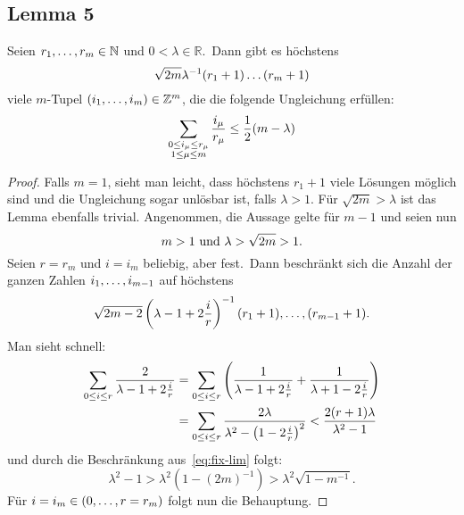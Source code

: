\subsection{Lemma 5}
    \label{subsec:lemma5}
    \textrm{Seien $r_1, \dots, r_m \in \mathbb{N}$ und $0 < \lambda \in \mathbb{R}$.\ Dann gibt es höchstens}
    \begin{equation*}
        \sqrt{2m} \lambda^{-1} (r_1 + 1) \dots (r_m +1)
    \end{equation*}
    \textrm{viele $m$-Tupel $(i_1, \dots, i_m) \in \mathbb{Z}^m$, die die folgende Ungleichung erfüllen:}
    \begin{equation*}
        \sum_{\substack{0 \leq i_\mu \leq r_\mu \\ 1 \leq \mu \leq m}} \frac{i_\mu}{r_\mu} \leq \frac{1}{2} (m - \lambda)
    \end{equation*}
    \begin{proof}
        \textrm{Falls $m = 1$, sieht man leicht, dass höchstens $r_1 + 1$ viele Lösungen möglich sind und die Ungleichung
        sogar unlösbar ist, falls $\lambda > 1$.
        \newline
        Für $\sqrt{2m} > \lambda$ ist das Lemma ebenfalls trivial.}
        \newline
        \textrm{Angenommen, die Aussage gelte für $m-1$ und seien nun}
        \begin{equation}
            m > 1 \ \textrm{und}\  \lambda > \sqrt{2m} > 1. \label{eq:sqrt-2m-ass}
        \end{equation}
        \textrm{Seien $r = r_m$ und $i = i_m$ beliebig, aber fest.\ Dann beschränkt sich die Anzahl der ganzen Zahlen
        $i_1, \dots, i_{m-1}$ auf höchstens}
        \begin{equation}
            \sqrt{2m - 2} \left( \lambda - 1 + 2 \frac{i}{r} \right)^{-1}(r_1+1), \dots, (r_{m-1}+1). \label{eq:fix-lim}
        \end{equation}
        Man sieht schnell:
        \begin{align*}
            \sum_{0 \leq i \leq r} \frac{2}{\lambda - 1 + 2\frac{i}{r}} &= \sum_{0 \leq i \leq r} \left( \frac{1}{\lambda -
            1 + 2 \frac{i}{r}} + \frac{1}{\lambda + 1 - 2 \frac{i}{r}} \right) \\ &= \sum_{0 \leq i \leq r} \frac{2 \lambda}
            {\lambda^2 - \left( 1 - 2 \frac{i}{r} \right)^2} < \frac{2 (r + 1) \lambda}{\lambda^2 - 1}
        \end{align*}
        \textrm{und durch die Beschränkung aus~\ref{eq:fix-lim} folgt:}
        \begin{equation*}
            \lambda^2 - 1 > \lambda^2 (1 - (2m)^{-1}) > \lambda^2 \sqrt{1 - m^{-1}}.
        \end{equation*}
        \textrm{Für $i = i_m \in (0, \dots, r = r_m)$ folgt nun die Behauptung.}
    \end{proof}
    

